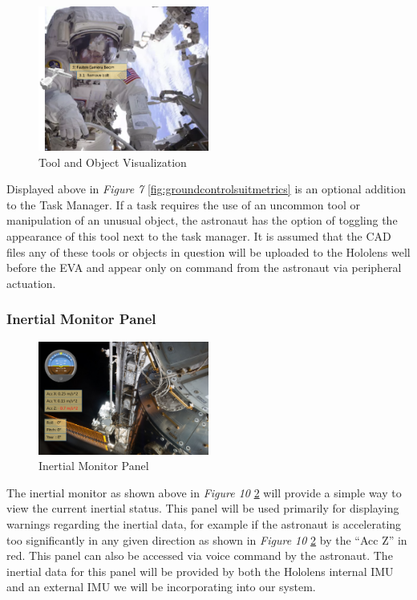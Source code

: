 \documentclass{article}
\let\Oldsubsubsection\subsubsection
\renewcommand{\subsubsection}{\FloatBarrier\Oldsubsubsection}
\begin{document}
\begin{figure}[!htb]
  \centering
  \includegraphics[width=0.5\textwidth]{assets/subtask.png}
  \caption{Tool and Object Visualization}
  \label{fig:subtask}
\end{figure}

Displayed above in \textit{Figure 7} \ref{fig:groundcontrolsuitmetrics} is an optional addition to the Task Manager. If a task requires the use of an uncommon tool or manipulation of an unusual object, the astronaut has the option of toggling the appearance of this tool next to the task manager. It is assumed that the CAD files any of these tools or objects in question will be uploaded to the Hololens well before the EVA and appear only on command from the astronaut via peripheral actuation.

\subsubsection{Inertial Monitor Panel}

\begin{figure}[!htb]
  \centering
  \includegraphics[width=0.5\textwidth]{assets/suitmetrics.png}
  \caption{Inertial Monitor Panel}
  \label{fig:suitmetrics}
\end{figure}

The inertial monitor as shown above in \textit{Figure 10} \ref{fig:suitmetrics} will provide a simple way to view the current inertial status. This panel will be used primarily for displaying warnings regarding the inertial data, for example if the astronaut is accelerating too significantly in any given direction as shown in \textit{Figure 10} \ref{fig:suitmetrics} by the “Acc Z” in red.  This panel can also be accessed via voice command by the astronaut. The inertial data for this panel will be provided by both the Hololens internal IMU and an external IMU we will be incorporating into our system.
\end{document}
